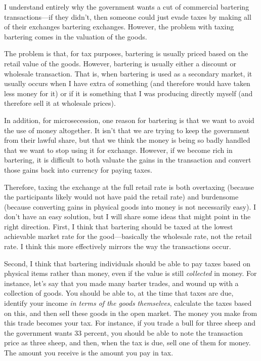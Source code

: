 \begin{policynote}
I understand entirely why the government wants a cut of commercial 
bartering transactions---if they didn't,
then someone could just evade taxes by making all of their exchanges bartering exchanges.
However, the problem with taxing bartering comes in the valuation of the goods.

The problem is that, for tax purposes, bartering is usually priced based on the retail value
of the goods.  However, bartering is usually either a discount or wholesale transaction.
That is, when bartering is used as a secondary market, it usually occurs when I have extra
of something (and therefore would have taken less money for it) or if it is something
that I was producing directly myself (and therefore sell it at wholesale prices).

In addition, for microsecession, one reason for bartering is that we want to avoid the
use of money altogether.  It isn't that we are trying to keep the government from their lawful
share, but that we think the money is being so badly handled that we want to stop
using it for exchange.  However, if we become rich in bartering, it is difficult to
both valuate the gains in the transaction and convert those gains back
into currency for paying taxes.

Therefore, taxing the exchange at the full retail rate is both overtaxing (because the 
participants likely would not have paid the retail rate) and burdensome (because converting
gains in physical goods into money is not necessarily easy).  
I don't have an easy
solution, but I will share some ideas that might point in the right direction.
First, I think that bartering should be taxed at the lowest achievable market
rate for the good---basically the wholesale rate, not the retail rate.  I think this more
effectively mirrors the way the transactions occur.  

Second, I think that bartering individuals
should be able to pay taxes based on physical items rather than money, even if the
value is still 
\textit{collected} in money.
For instance, let's say that you made
many barter trades, and wound up with a collection of goods.  You should be able to,
at the time that taxes are due, identify your income \textit{in terms of the goods themselves},
calculate the taxes based on this, and then sell these goods in the open market. The
money you make from this trade becomes your tax.  For instance, if you trade a bull
for three sheep and the government wants 33 percent, you should be able to note the transaction
price as three sheep, and then, when the tax is due, sell one of them for money.  The amount 
you receive is the amount you pay in tax.


\end{policynote}
